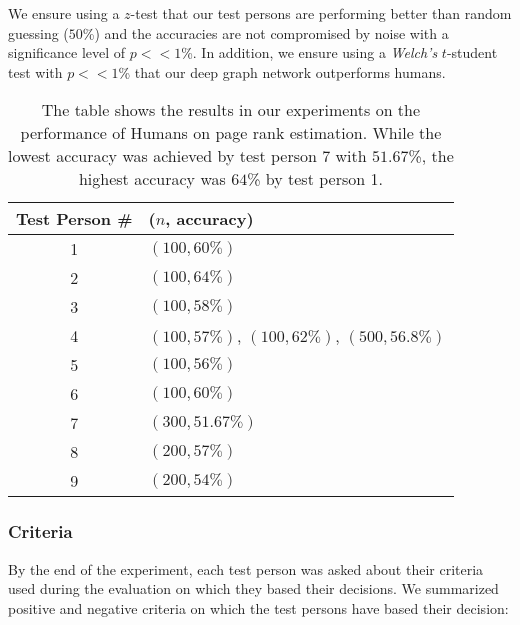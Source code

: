 We ensure using a $z$-test that our test persons are performing better than random guessing ($50$\%) and the accuracies are not compromised by noise with a significance level of $p << 1$\%. In addition, we ensure using a \textit{Welch's} $t$-student test with $p << 1$\% that our deep graph network outperforms humans.

\begin{table}[]
	\center
	\begin{tabular}{c||l}
		Test Person \#  & ($n$, accuracy)\\ \hline \hline
		1 &  $(100, 60\%)$ \\ \hline
		2 &  $(100, 64\%)$\\ \hline
		3 &  $(100, 58\%)$\\ \hline
		4 &  $(100, 57\%)$, $(100, 62\%)$, $(500, 56.8\%)$\\ \hline
		5 &  $(100, 56\%)$\\ \hline
		6 &  $(100, 60\%)$\\ \hline
		7 &  $(300, 51.67\%)$\\ \hline
		8 &  $(200, 57\%)$\\ \hline
		9 &  $(200, 54\%)$\\
	\end{tabular}
	\caption[Results of Human Performance on Page Rank Estimation]{The table shows the results in our experiments on the performance of Humans on page rank estimation. While the lowest accuracy was achieved by test person 7 with $51.67$\%, the highest accuracy was $64$\% by test person 1.}
\label{table_human_eval_results}
\end{table}

\subsubsection{Criteria}
By the end of the experiment, each test person was asked about their criteria used during the evaluation on which they based their decisions. We summarized positive and negative criteria on which the test persons have based their decision:

